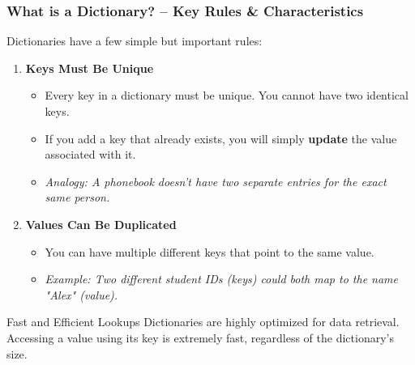\documentclass{beamer}
\begin{document}
\begin{frame}[fragile]
    \frametitle{What is a Dictionary? -- Key Rules \& Characteristics}
    Dictionaries have a few simple but important rules:

    \begin{enumerate}
        \item \textbf{Keys Must Be Unique}
        \begin{itemize}
            \item Every key in a dictionary must be unique. You cannot have two identical keys.
            \item If you add a key that already exists, you will simply \textbf{update} the value associated with it.
            \item \textit{Analogy: A phonebook doesn't have two separate entries for the exact same person.}
        \end{itemize}
        \vspace{0.5cm}

        \item \textbf{Values Can Be Duplicated}
        \begin{itemize}
            \item You can have multiple different keys that point to the same value.
            \item \textit{Example: Two different student IDs (keys) could both map to the name "Alex" (value).}
        \end{itemize}
    \end{enumerate}

    \begin{block}{Fast and Efficient Lookups}
        Dictionaries are highly optimized for data retrieval. Accessing a value using its key is extremely fast, regardless of the dictionary's size.
    \end{block}
\end{frame}
\end{document}
